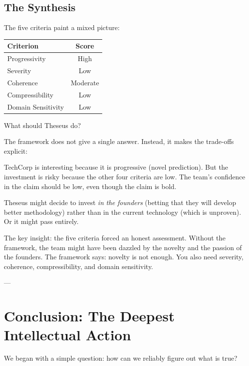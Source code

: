 \documentclass[11pt,letterpaper]{article}
\begin{document}
\subsection*{The Synthesis}

The five criteria paint a mixed picture:

\begin{center}
\begin{tabular}{|l|c|}
\hline
\textbf{Criterion} & \textbf{Score} \\
\hline
Progressivity & High \\
Severity & Low \\
Coherence & Moderate \\
Compressibility & Low \\
Domain Sensitivity & Low \\
\hline
\end{tabular}
\end{center}

What should Theseus do?

The framework does not give a single answer. Instead, it makes the trade-offs explicit:

TechCorp is interesting because it is progressive (novel prediction). But the investment is risky because the other four criteria are low. The team's confidence in the claim should be low, even though the claim is bold.

Theseus might decide to invest \textit{in the founders} (betting that they will develop better methodology) rather than in the current technology (which is unproven). Or it might pass entirely.

The key insight: the five criteria forced an honest assessment. Without the framework, the team might have been dazzled by the novelty and the passion of the founders. The framework says: novelty is not enough. You also need severity, coherence, compressibility, and domain sensitivity.

---

\newpage


\section{Conclusion: The Deepest Intellectual Action}

We began with a simple question: how can we reliably figure out what is true?
\end{document}
